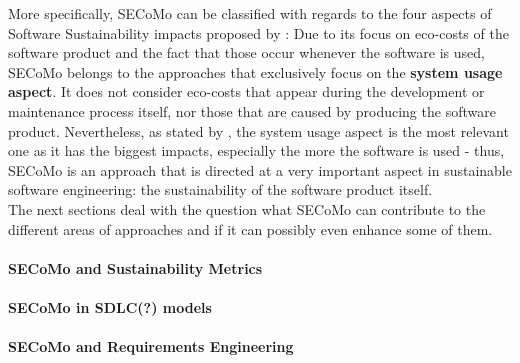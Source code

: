More specifically, SECoMo can be classified with regards to the four aspects of Software Sustainability impacts proposed by \cite{penzenstadler_supporting_2012}: Due to its focus on eco-costs of the software product and the fact that those occur whenever the software is used, SECoMo belongs to the approaches that exclusively focus on the \textbf{system usage aspect}. It does not consider eco-costs that appear during the development or maintenance process itself, nor those that are caused by producing the software product. Nevertheless, as stated by \cite{penzenstadler_what_13}, the system usage aspect is the most relevant one as it has the biggest impacts, especially the more the software is used - thus, SECoMo is an approach that is directed at a very important aspect in sustainable software engineering: the sustainability of the software product itself.\\
The next sections deal with the question what SECoMo can contribute to the different areas of approaches and if it can possibly even enhance some of them.

\paragraph{SECoMo and Sustainability Metrics}


\paragraph{SECoMo in SDLC(?) models}



\paragraph{SECoMo and Requirements Engineering}




